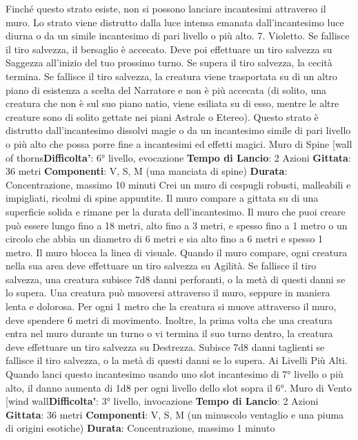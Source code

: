 \begin{multicols}{2}
Finché questo strato esiste, non si possono lanciare
incantesimi attraverso il muro. Lo strato viene distrutto
dalla luce intensa emanata dall’incantesimo luce diurna
o da un simile incantesimo di pari livello o più alto.
7. Violetto. Se fallisce il tiro salvezza, il bersaglio è
accecato. Deve poi effettuare un tiro salvezza su
Saggezza all’inizio del tuo prossimo turno. Se supera il
tiro salvezza, la cecità termina. Se fallisce il tiro
salvezza, la creatura viene trasportata su di un altro
piano di esistenza a scelta del Narratore e non è più accecata
(di solito, una creatura che non è sul suo piano natio,
viene esiliata su di esso, mentre le altre creature sono
di solito gettate nei piani Astrale o Etereo). Questo
strato è distrutto dall’incantesimo dissolvi magie o da un
incantesimo simile di pari livello o più alto che possa
porre fine a incantesimi ed effetti magici.
Muro di Spine
[wall of thorns\textbf{Difficolta'}:
6° livello, evocazione
\textbf{Tempo di Lancio}: 2 Azioni
\textbf{Gittata}: 36 metri
\textbf{Componenti}: V, S, M (una manciata di spine)
\textbf{Durata}: Concentrazione, massimo 10 minuti
Crei un muro di cespugli robusti, malleabili e impigliati,
ricolmi di spine appuntite. Il muro compare a gittata su
di una superficie solida e rimane per la durata
dell’incantesimo. Il muro che puoi creare può essere
lungo fino a 18 metri, alto fino a 3 metri, e spesso fino a
1 metro o un circolo che abbia un diametro di 6 metri e
sia alto fino a 6 metri e spesso 1 metro. Il muro blocca
la linea di visuale.
Quando il muro compare, ogni creatura nella sua area
deve effettuare un tiro salvezza su Agilità. Se
fallisce il tiro salvezza, una creatura subisce 7d8 danni
perforanti, o la metà di questi danni se lo supera.
Una creatura può muoversi attraverso il muro, seppure
in maniera lenta e dolorosa. Per ogni 1 metro che la
creatura si muove attraverso il muro, deve spendere 6
metri di movimento. Inoltre, la prima volta che una
creatura entra nel muro durante un turno o vi termina il
suo turno dentro, la creatura deve effettuare un tiro
salvezza su Destrezza. Subisce 7d8 danni taglienti se
fallisce il tiro salvezza, o la metà di questi danni se lo
supera.
Ai Livelli Più Alti. Quando lanci questo incantesimo
usando uno slot incantesimo di 7° livello o più alto, il
danno aumenta di 1d8 per ogni livello dello slot sopra il
6°.
Muro di Vento
[wind wall\textbf{Difficolta'}:
3° livello, invocazione
\textbf{Tempo di Lancio}: 2 Azioni
\textbf{Gittata}: 36 metri
\textbf{Componenti}: V, S, M (un minuscolo ventaglio e una
piuma di origini esotiche)
\textbf{Durata}: Concentrazione, massimo 1 minuto

\end{multicols}
